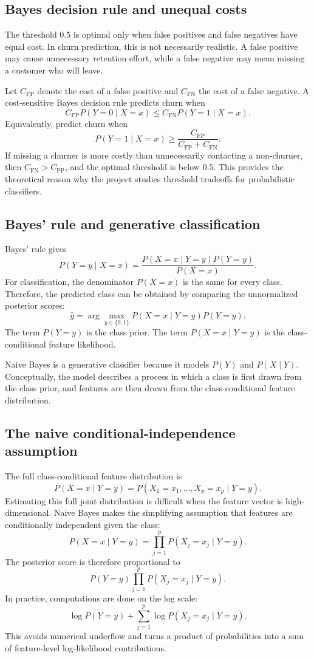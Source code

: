 \subsection{Bayes decision rule and unequal costs}

The threshold \(0.5\) is optimal only when false positives and false negatives have equal cost. In churn prediction, this is not necessarily realistic. A false positive may cause unnecessary retention effort, while a false negative may mean missing a customer who will leave.

Let \(C_{\mathrm{FP}}\) denote the cost of a false positive and \(C_{\mathrm{FN}}\) the cost of a false negative. A cost-sensitive Bayes decision rule predicts churn when
\[
C_{\mathrm{FP}}P(Y=0\mid X=x)
\leq
C_{\mathrm{FN}}P(Y=1\mid X=x).
\]
Equivalently, predict churn when
\[
P(Y=1\mid X=x)
\geq
\frac{C_{\mathrm{FP}}}{C_{\mathrm{FP}}+C_{\mathrm{FN}}}.
\]
If missing a churner is more costly than unnecessarily contacting a non-churner, then \(C_{\mathrm{FN}}>C_{\mathrm{FP}}\), and the optimal threshold is below \(0.5\). This provides the theoretical reason why the project studies threshold tradeoffs for probabilistic classifiers.

\subsection{Bayes' rule and generative classification}

Bayes' rule gives
\[
P(Y=y\mid X=x)
=
\frac{
P(X=x\mid Y=y)P(Y=y)
}{
P(X=x)
}.
\]
For classification, the denominator \(P(X=x)\) is the same for every class. Therefore, the predicted class can be obtained by comparing the unnormalized posterior scores:
\[
\widehat{y}
=
\arg\max_{y\in\{0,1\}}
P(X=x\mid Y=y)P(Y=y).
\]
The term \(P(Y=y)\) is the class prior. The term \(P(X=x\mid Y=y)\) is the class-conditional feature likelihood.

Naive Bayes is a generative classifier because it models \(P(Y)\) and \(P(X\mid Y)\). Conceptually, the model describes a process in which a class is first drawn from the class prior, and features are then drawn from the class-conditional feature distribution.

\subsection{The naive conditional-independence assumption}

The full class-conditional feature distribution is
\[
P(X=x\mid Y=y)
=
P(X_1=x_1,\ldots,X_p=x_p\mid Y=y).
\]
Estimating this full joint distribution is difficult when the feature vector is high-dimensional. Naive Bayes makes the simplifying assumption that features are conditionally independent given the class:
\[
P(X=x\mid Y=y)
=
\prod_{j=1}^{p}
P(X_j=x_j\mid Y=y).
\]
The posterior score is therefore proportional to
\[
P(Y=y)
\prod_{j=1}^{p}
P(X_j=x_j\mid Y=y).
\]
In practice, computations are done on the log scale:
\[
\log P(Y=y)
+
\sum_{j=1}^{p}
\log P(X_j=x_j\mid Y=y).
\]
This avoids numerical underflow and turns a product of probabilities into a sum of feature-level log-likelihood contributions.

